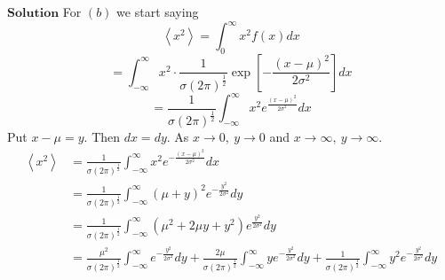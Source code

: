 $\boxed{\textbf{Solution}}$ For $(b)$ we start saying
$$
\left\langle x^{2}\right\rangle=\int_{0}^{\infty} x^{2} f(x) d x
$$
$$
=\int_{-\infty}^{\infty} x^{2} \cdot \frac{1}{\sigma(2 \pi)^{\frac{1}{2}}} \exp \left[-\frac{(x-\mu)^{2}}{2 \sigma^{2}}\right] d x
$$
$$
=\frac{1}{\sigma(2 \pi)^{\frac{1}{2}}} \int_{-\infty}^{\infty} x^{2} e^{\frac{(x-\mu)^{2}}{2 \sigma^{2}}} d x
$$
Put $x-\mu=y .$ Then $d x=d y .$ As $x \rightarrow 0, \  y \rightarrow 0$ and $x \rightarrow \infty, \  y \rightarrow \infty$.
$$
\begin{aligned}
\left\langle x^{2}\right\rangle&=\frac{1}{\sigma(2 \pi)^{\frac{1}{2}}} \int_{-\infty}^{\infty} x^{2} e^{-\frac{(x-\mu)^{2}}{2 \sigma^{2}}} d x \\
&=\frac{1}{\sigma(2 \pi)^{\frac{1}{2}}} \int_{-\infty}^{\infty}(\mu+y)^{2} e^{-\frac{y^{2}}{2 \sigma^{2}}} d y \\
&=\frac{1}{\sigma(2 \pi)^{\frac{1}{2}}} \int_{-\infty}^{\infty}\left(\mu^{2}+2 \mu y+y^{2}\right) e^{\frac{y^{2}}{2 \sigma^{2}}} d y \\
&=\frac{\mu^{2}}{\sigma(2 \pi)^{\frac{1}{2}}} \int_{-\infty}^{\infty} e^{-\frac{y^{2}}{2 \sigma^{2}}} d y+\frac{2 \mu}{\sigma(2 \pi)^{\frac{1}{2}}} \int_{-\infty}^{\infty} y e^{-\frac{y^{2}}{2 \sigma^{2}}} d y+\frac{1}{\sigma(2 \pi)^{\frac{1}{2}}} \int_{-\infty}^{\infty} y^{2} e^{-\frac{y^{2}}{2 \sigma^{2}}} d y
\end{aligned}
$$

